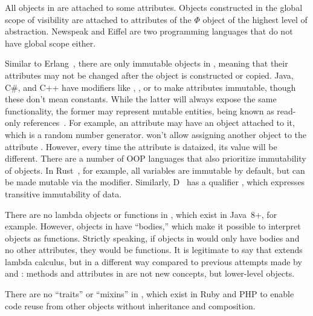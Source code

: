 %
All objects in \eolang{} are attached to some attributes. Objects constructed
in the global scope of visibility are attached to attributes of the
\(\Phi\) object of the highest level of abstraction.
Newspeak and Eiffel are two programming languages that do not have global scope either.

%
Similar to Erlang~\citep{armstrong2010erlang},
there are only immutable objects in \eolang{}, meaning that their attributes may
not be changed after the object is constructed or copied.
Java, C\#, and C++ have modifiers like
, , or  to make attributes immutable, though these
don't mean constants. While the latter will
always expose the same functionality, the former may represent mutable
entities, being known as read-only references~\citep{birka2004practical}.
For example, an attribute  may have an object 
attached to it, which is a random number generator. \eolang{} won't allow
assigning another object to the attribute . However, every time
the attribute is dataized, its value will be different.
%
There are a number of OOP languages that also prioritize immutability of objects.
In Rust~\citep{matsakis2014rust}, for example, all variables are immutable by
default, but can be made mutable via the  modifier. Similarly,
D~\citep{bright2020origins} has a qualifier , which expresses
transitive immutability of data.

%
There are no lambda objects or functions in \eolang{}, which exist in Java~8+, for example.
However, objects in \eolang{} have ``bodies,'' which make it possible to interpret
objects as functions.
Strictly speaking, if objects in \eolang{} would only have bodies and no other attributes,
they would be functions. It is legitimate to
say that \eolang{} extends lambda calculus, but in a different way
compared to previous attempts made by~\citet{mitchell1993lambda} and \citet{di1998lambda}:
methods and attributes in \eolang{} are not new concepts, but lower-level
objects.

%
There are no ``traits'' or ``mixins'' in \eolang{}, which exist in Ruby and PHP to enable
code reuse from other objects without inheritance and composition.

